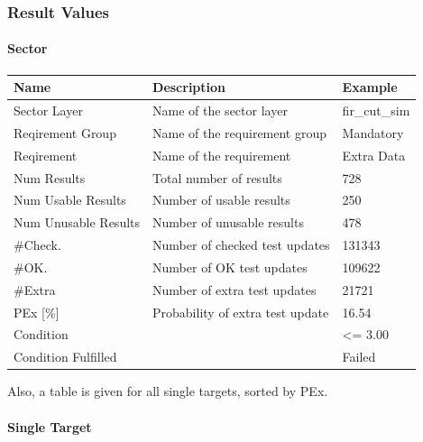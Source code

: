 \subsubsection{Result Values}

\paragraph{Sector}

\begin{center}
 \begin{table}[H]
  \begin{tabularx}{\textwidth}{ | l | X |  l | }
    \hline
    \textbf{Name} & \textbf{Description} & \textbf{Example} \\ \hline
    Sector Layer & Name of the sector layer & fir\_cut\_sim  \\ \hline
    Reqirement Group & Name of the requirement group & Mandatory  \\ \hline
    Reqirement & Name of the requirement & Extra Data  \\ \hline 
    Num Results & Total number of results & 728 \\ \hline
    Num Usable Results & Number of usable results & 250 \\ \hline
    Num Unusable Results & Number of unusable results & 478 \\ \hline
    \#Check. & Number of checked test updates & 131343 \\ \hline
    \#OK. & Number of OK test updates & 109622 \\ \hline
    \#Extra & Number of extra test updates & 21721 \\ \hline
    PEx [\%] & Probability of extra test update & 16.54 \\ \hline
    Condition &  & <= 3.00 \\ \hline
    Condition Fulfilled &  & Failed \\ \hline
\end{tabularx}
\end{table}
\end{center}

Also, a table is given for all single targets, sorted by PEx.

\paragraph{Single Target}

